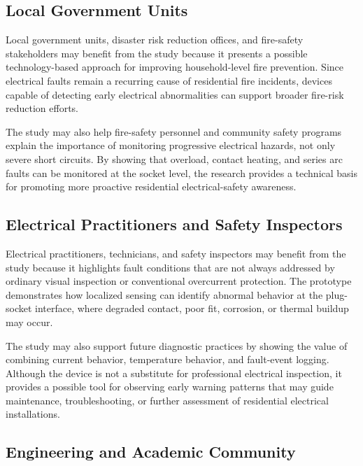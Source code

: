 \subsection{Local Government Units}\label{local-government-units}

Local government units, disaster risk reduction offices, and fire-safety
stakeholders may benefit from the study because it presents a possible
technology-based approach for improving household-level fire prevention.
Since electrical faults remain a recurring cause of residential fire
incidents, devices capable of detecting early electrical abnormalities
can support broader fire-risk reduction efforts.

The study may also help fire-safety personnel and community safety
programs explain the importance of monitoring progressive electrical
hazards, not only severe short circuits. By showing that overload,
contact heating, and series arc faults can be monitored at the socket
level, the research provides a technical basis for promoting more
proactive residential electrical-safety awareness.

\subsection{Electrical Practitioners and Safety Inspectors}\label{electrical-practitioners-and-safety-inspectors}

Electrical practitioners, technicians, and safety inspectors may benefit
from the study because it highlights fault conditions that are not
always addressed by ordinary visual inspection or conventional
overcurrent protection. The prototype demonstrates how localized sensing
can identify abnormal behavior at the plug-socket interface, where
degraded contact, poor fit, corrosion, or thermal buildup may occur.

The study may also support future diagnostic practices by showing the
value of combining current behavior, temperature behavior, and
fault-event logging. Although the device is not a substitute for
professional electrical inspection, it provides a possible tool for
observing early warning patterns that may guide maintenance,
troubleshooting, or further assessment of residential electrical
installations.

\subsection{Engineering and Academic Community}\label{engineering-and-academic-community}

